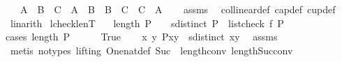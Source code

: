 \begin{isabellebody}
\ \ \ {\isachardoublequoteopen}{\isacharparenleft}{\kern0pt}A\ {\isasymor}\ B\ {\isasymor}\ C{\isacharparenright}{\kern0pt}\ {\isasymand}\ {\isacharparenleft}{\kern0pt}{\isacharparenleft}{\kern0pt}{\isasymnot}A\ {\isasymand}\ {\isasymnot}B{\isacharparenright}{\kern0pt}\ {\isasymor}\ {\isacharparenleft}{\kern0pt}{\isasymnot}B\ {\isasymand}\ {\isasymnot}C{\isacharparenright}{\kern0pt}\ {\isasymor}\ {\isacharparenleft}{\kern0pt}{\isasymnot}C\ {\isasymand}\ {\isasymnot}A{\isacharparenright}{\kern0pt}{\isacharparenright}{\kern0pt}{\isachardoublequoteclose}\isanewline
%
\isadelimproof
\ \ %
\endisadelimproof
%
\isatagproof
{}\isamarkupfalse%
\ assms\ \isamarkupfalse%
\ collinear{}{\isacharunderscore}{\kern0pt}def\ cap{}{\isacharunderscore}{\kern0pt}def\ cup{}{\isacharunderscore}{\kern0pt}def\ \isamarkupfalse%
\ linarith%
\endisatagproof
{\isafoldproof}%
%
\isadelimproof
\isanewline
%
\endisadelimproof
\isanewline
{}\isamarkupfalse%
\ lcheck{\isacharunderscore}{\kern0pt}len{}{\isacharunderscore}{\kern0pt}T{\isacharcolon}{\kern0pt}\isanewline
\ \ \ {\isachardoublequoteopen}length\ P\ {\isasymle}\ {}{\isachardoublequoteclose}\ \ {\isachardoublequoteopen}sdistinct\ P{\isachardoublequoteclose}\ \ {\isachardoublequoteopen}list{\isacharunderscore}{\kern0pt}check\ f\ P{\isachardoublequoteclose}\isanewline
%
\isadelimproof
%
\endisadelimproof
%
\isatagproof
{}\isamarkupfalse%
{\isacharparenleft}{\kern0pt}cases\ {\isachardoublequoteopen}length\ P\ {\isacharequal}{\kern0pt}\ {}{\isachardoublequoteclose}{\isacharparenright}{\kern0pt}\isanewline
\ \ \isamarkupfalse%
\ True\isanewline
\ \ \isamarkupfalse%
\ {\isachardoublequoteopen}{\isasymexists}x\ y{\isachardot}{\kern0pt}\ P{\isacharequal}{\kern0pt}{\isacharbrackleft}{\kern0pt}x{\isacharcomma}{\kern0pt}y{\isacharbrackright}{\kern0pt}\ {\isasymand}\ sdistinct\ {\isacharbrackleft}{\kern0pt}x{\isacharcomma}{\kern0pt}y{\isacharbrackright}{\kern0pt}{\isachardoublequoteclose}\ \isamarkupfalse%
\ assms{\isacharparenleft}{\kern0pt}{}{\isacharparenright}{\kern0pt}\isanewline
\ \ \ \ \isamarkupfalse%
\ {\isacharparenleft}{\kern0pt}metis\ {\isacharparenleft}{\kern0pt}no{\isacharunderscore}{\kern0pt}types{\isacharcomma}{\kern0pt}\ lifting{\isacharparenright}{\kern0pt}\ One{\isacharunderscore}{\kern0pt}nat{\isacharunderscore}{\kern0pt}def\ Suc{\isacharunderscore}{\kern0pt}{}\ \ length{\isacharunderscore}{\kern0pt}{}{\isacharunderscore}{\kern0pt}conv\ length{\isacharunderscore}{\kern0pt}Suc{\isacharunderscore}{\kern0pt}conv{\isacharparenright}{\kern0pt}\isanewline

\end{isabellebody}
